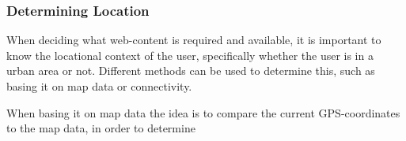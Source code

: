 \subsubsection{Determining Location}

When deciding what web-content is required and available, it is important to know the locational context of the user, specifically whether the user is in a urban area or not. Different methods can be used to determine this, such as basing it on map data or connectivity.

When basing it on map data the idea is to compare the current GPS-coordinates to the map data, in order to determine 